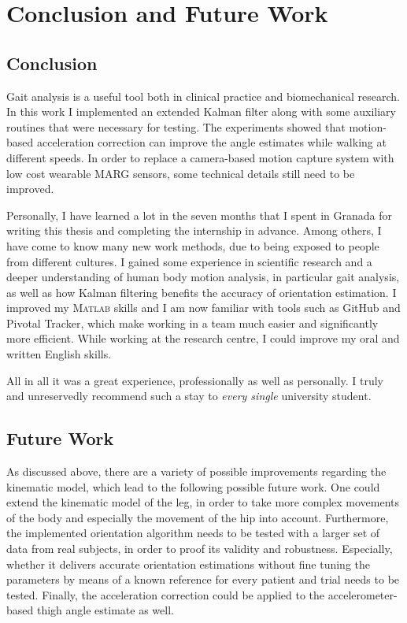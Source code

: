 \chapter{Conclusion and Future Work}
\label{ch:Conclusion and Future Work}

\section{Conclusion}

Gait analysis is a useful tool both in clinical practice and biomechanical research. In this work I implemented an extended Kalman filter along with some auxiliary routines that were necessary for testing. The experiments showed that motion-based acceleration correction can improve the angle estimates while walking at different speeds. In order to replace a camera-based motion capture system with low cost wearable MARG sensors, some technical details still need to be improved.

Personally, I have learned a lot in the seven months that I spent in Granada for writing this thesis and completing the internship in advance. Among others, I have come to know many new work methods, due to being exposed to people from different cultures. I gained some experience in scientific research and a deeper understanding of human body motion analysis, in particular gait analysis, as well as how Kalman filtering benefits the accuracy of orientation estimation. I improved my \textsc{Matlab}\textsuperscript{\textregistered} skills and I am now familiar with tools such as GitHub and Pivotal Tracker, which make working in a team much easier and significantly more efficient.  While working at the research centre, I could improve my oral and written English skills.

All in all it was a great experience, professionally as well as personally. I truly and unreservedly recommend such a stay to \emph{every single} university student.

\section{Future Work}

As discussed above, there are a variety of possible improvements regarding the kinematic model, which lead to the following possible future work. One could extend the kinematic model of the leg, in order to take more complex movements of the body and especially the movement of the hip into account. Furthermore, the implemented orientation algorithm needs to be tested with a larger set of data from real subjects, in order to proof its validity and robustness. Especially, whether it delivers accurate orientation estimations without fine tuning the parameters by means of a known reference for every patient and trial needs to be tested. Finally, the acceleration correction could be applied to the accelerometer-based thigh angle estimate as well.

